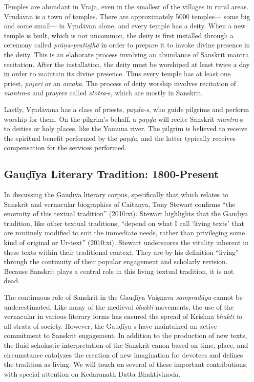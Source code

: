 Temples are abundant in Vraja, even in the smallest of the villages in rural areas. Vṛndāvan is a town of temples. There are approximately 5000 temples— some big and some small— in Vṛndāvan alone, and every temple has a deity. When a new temple is built, which is not uncommon, the deity is first installed through a ceremony called {\sl prāṇa-pratiṣṭhā} in order to prepare it to invoke divine presence in the deity. This is an elaborate process involving an abundance of Sanskrit mantra recitation. After the installation, the deity must be worshiped at least twice a day in order to maintain its divine presence. Thus every temple has at least one priest, {\sl pūjāri} or an {\sl arcaka}. The process of deity worship involves recitation of {\sl mantra}-s and prayers called {\sl stotra}-s, which are mostly in Sanskrit. 

Lastly, Vṛndāvana has a class of priests, {\sl paṇḍa-s}, who guide pilgrims and perform worship for them. On the pilgrim’s behalf, a {\sl paṇḍa} will recite Sanskrit {\sl mantra}-s to deities or holy places, like the Yamuna river. The pilgrim is believed to receive the spiritual benefit performed by the {\sl paṇḍa}, and the latter typically receives compensation for the services performed.
\vskip -50pt

\subsection*{Gauḍīya Literary Tradition: 1800-Present}

In discussing the Gauḍīya literary corpus, specifically that which relates to Sanskrit and vernacular biographies of Caitanya, Tony Stewart confirms “the enormity of this textual tradition” (2010:xi). Stewart highlights that the Gauḍīya tradition, like other textual traditions, “depend on what I call ‘living texts’ that are routinely modified to suit the immediate needs, rather than privileging some kind of original or Ur-text” (2010:xi). Stewart underscores the vitality inherent in these texts within their traditional context. They are by his definition “living” through the continuity of their popular engagement and scholarly revision. Because Sanskrit plays a central role in this living textual tradition, it is not dead.

The continuous role of Sanskrit in the Gauḍīya Vaiṣṇava {\sl sampradāya} cannot be underestimated. Like many of the medieval {\sl bhakti} movements, the use of the vernacular in various literary forms has ensured the spread of Krishna {\sl bhakti} to all strata of society. However, the Gauḍīya-s have maintained an active commitment to Sanskrit engagement. In addition to the production of new texts, the fluid scholastic interpretation of the Sanskrit canon based on time, place, and circumstance catalyzes the creation of new imagination for devotees and defines the tradition as living. We will touch on several of these important contributions, with special attention on Kedaranath Datta Bhaktivinoda. 


